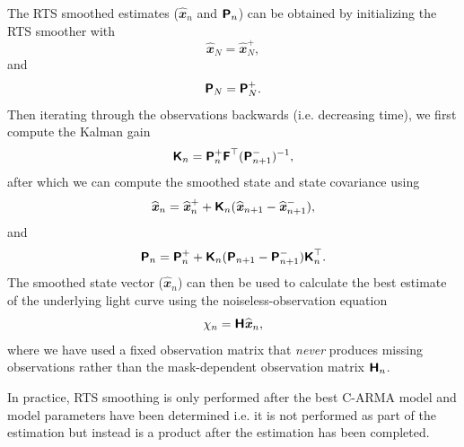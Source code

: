 \documentclass[a4paper,fleqn,usenatbib]{mnras}
\begin{document}
The RTS smoothed estimates ($\widehat{\mathbfit{x}}_{n}$ and $\textbf{\textsf{P}}_{n}$) can be obtained by initializing the RTS smoother with
\begin{equation}\label{eq:xRTSInit}
\widehat{\mathbfit{x}}_{N} = \widehat{\mathbfit{x}}^{+}_{N},
\end{equation}
and
\begin{equation}\label{eq:PRTSInit}
\textbf{\textsf{P}}_{N} = \textbf{\textsf{P}}^{+}_{N}.
\end{equation}
Then iterating through the observations backwards (i.e. decreasing time), we first compute the Kalman gain
\begin{equation}\label{eq:KalmanRTS}
\textbf{\textsf{K}}_{n} = \textbf{\textsf{P}}^{+}_{n} \textbf{\textsf{F}}^{\top} (\textbf{\textsf{P}}^{-}_{n+1})^{-1},
\end{equation}
after which we can compute the smoothed state and state covariance using 
\begin{equation}\label{eq:xRTS}
\widehat{\textbf{\textit{x}}}_{n} = \widehat{\textbf{\textit{x}}}^{+}_{n} + \textbf{\textsf{K}}_{n} (\widehat{\textbf{\textit{x}}}_{n+1} - \widehat{\textbf{\textit{x}}}^{-}_{n+1}),
\end{equation}
and
\begin{equation}\label{eq:PRTS}
\textbf{\textsf{P}}_{n} = \textbf{\textsf{P}}^{+}_{n} + \textbf{\textsf{K}}_{n} (\textbf{\textsf{P}}_{n+1} - \textbf{\textsf{P}}^{-}_{n+1}) \textbf{\textsf{K}}_{n}^{\top}.
\end{equation}
The smoothed state vector ($\widehat{\mathbfit{x}}_{n}$) can then be used to calculate the best estimate of the underlying light curve using the noiseless-observation equation
\begin{equation}\label{eq:NoiselessObsEq}
\chi_{n} = \textbf{\textsf{H}} \widehat{\textbf{\textit{x}}}_{n},
\end{equation}
where we have used a fixed observation matrix that \textit{never} produces missing observations rather than the mask-dependent observation matrix $\textbf{\textsf{H}}_{n}$. 

In practice, RTS smoothing is only performed after the best C-ARMA model and model parameters have been determined i.e. it is not performed as part of the estimation but instead is a product after the estimation has been completed.

\end{document}
